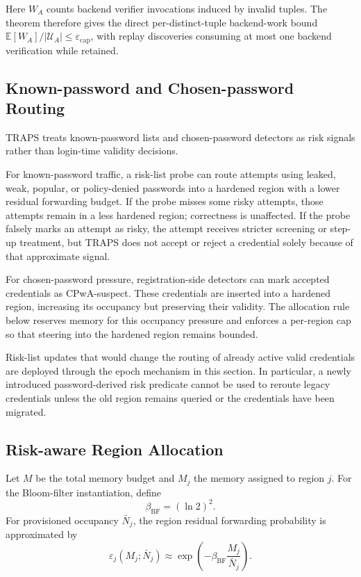 Here \(W_A\) counts backend verifier invocations induced by invalid tuples. The theorem therefore gives the direct per-distinct-tuple backend-work bound \(\mathbb E[W_A]/|\mathcal U_A|\le\varepsilon_{\mathrm{cap}}\), with replay discoveries consuming at most one backend verification while retained.

\subsection{Known-password and Chosen-password Routing}

TRAPS treats known-password lists and chosen-password detectors as risk signals rather than login-time validity decisions.

For known-password traffic, a risk-list probe can route attempts using leaked, weak, popular, or policy-denied passwords into a hardened region with a lower residual forwarding budget. If the probe misses some risky attempts, those attempts remain in a less hardened region; correctness is unaffected. If the probe falsely marks an attempt as risky, the attempt receives stricter screening or step-up treatment, but TRAPS does not accept or reject a credential solely because of that approximate signal.

For chosen-password pressure, registration-side detectors can mark accepted credentials as CPwA-suspect. These credentials are inserted into a hardened region, increasing its occupancy but preserving their validity. The allocation rule below reserves memory for this occupancy pressure and enforces a per-region cap so that steering into the hardened region remains bounded.

Risk-list updates that would change the routing of already active valid credentials are deployed through the epoch mechanism in this section. In particular, a newly introduced password-derived risk predicate cannot be used to reroute legacy credentials unless the old region remains queried or the credentials have been migrated.

\subsection{Risk-aware Region Allocation}

Let \(M\) be the total memory budget and \(M_j\) the memory assigned to region \(j\). For the Bloom-filter instantiation, define
\[
\beta_{\mathrm{BF}}=(\ln 2)^2.
\]
For provisioned occupancy \(\bar N_j\), the region residual forwarding probability is approximated by
\[
\varepsilon_j(M_j;\bar N_j)
\approx
\exp
\left(
-\beta_{\mathrm{BF}}\frac{M_j}{\bar N_j}
\right).
\]

